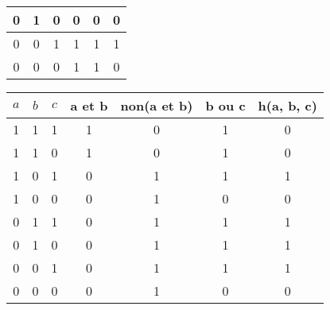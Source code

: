 \documentclass[12pt]{article}
\begin{document}
\begin{MaReponse}
\begin{alphenum}
\begin{center}
\begin{tabular}{|c|c|c|c|c|c|}
					0 & 1 & 0 & 0 & 0 & 0 \\ \hline
					0 & 0 & 1 & 1 & 1 & 1 \\ \hline
					0 & 0 & 0 & 1 & 1 & 0\\ \hline
				\end{tabular}
			\end{center}
			\item 
			\begin{center}		
				\begin{tabular}{|c|c|c|c|c|c|c|}
					\hline
					$a$ & $b$ & $c$ & a et b & non(a et b) & b ou c& h(a, b, c)\\ \hline
					1 & 1 & 1 & 1 & 0 & 1 & 0\\ \hline
					1 & 1 & 0 & 1 & 0 & 1 & 0\\ \hline
					1 & 0 & 1 & 0 & 1 & 1 & 1\\ \hline
					1 & 0 & 0 & 0 & 1 & 0 & 0\\ \hline
					0 & 1 & 1 & 0 & 1 & 1 & 1\\ \hline
					0 & 1 & 0 & 0 & 1 & 1 & 1\\ \hline
					0 & 0 & 1 & 0 & 1 & 1 & 1\\ \hline
					0 & 0 & 0 & 0 & 1 & 0& 0\\ \hline
				\end{tabular}
			\end{center}
		\end{alphenum}
	\end{MaReponse}
	
\end{document}
